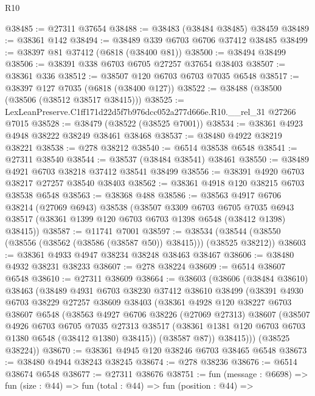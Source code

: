 \begin{lexlean}{R10}
\begin{coremodule}
@38485 := @27311 @37654
@38488 := @38483 (@38484 @38485) @38459
@38489 := @38361 @142
@38494 := @38489 @339 @6703 @6706 @37412 @38485
@38499 := @38397 @81 @37412 (@6818 (@38400 @81))
@38500 := @38494 @38499
@38506 := @38391 @338 @6703 @6705 @27257 @37654 @38403
@38507 := @38361 @336
@38512 := @38507 @120 @6703 @6703 @7035 @6548
@38517 := @38397 @127 @7035 (@6818 (@38400 @127))
@38522 := @38488 (@38500 (@38506 (@38512 @38517 @38415)))
@38525 := LexLeanPreserve.C1ff171d22d5f7b976dcc052a277d666e.R10.__rel_31 @27266 @7015
@38528 := @38479 (@38522 (@38525 @7001))
@38534 := @38361 @4923 @4948 @38222 @38249 @38461 @38468
@38537 := @38480 @4922 @38219 @38221
@38538 := @278 @38212
@38540 := @6514 @38538 @6548
@38541 := @27311 @38540
@38544 := @38537 (@38484 @38541) @38461
@38550 := @38489 @4921 @6703 @38218 @37412 @38541 @38499
@38556 := @38391 @4920 @6703 @38217 @27257 @38540 @38403
@38562 := @38361 @4918 @120 @38215 @6703 @38538 @6548
@38563 := @38368 @488
@38586 := @38563
    @4917
    @6706
    @38214
    (@27069 @6943)
    @38538
    (@38507
      @3309
      @6703
      @6705
      @7035
      @6943
      @38517
      (@38361 @1399 @120 @6703 @6703 @1398 @6548 (@38412 @1398) @38415))
@38587 := @11741 @7001
@38597 := @38534 (@38544 (@38550 (@38556 (@38562 (@38586 (@38587 @50)) @38415))) (@38525 @38212))
@38603 := @38361 @4933 @4947 @38234 @38248 @38463 @38467
@38606 := @38480 @4932 @38231 @38233
@38607 := @278 @38224
@38609 := @6514 @38607 @6548
@38610 := @27311 @38609
@38664 := @38603
    (@38606
      (@38484 @38610)
      @38463
      (@38489
        @4931
        @6703
        @38230
        @37412
        @38610
        @38499
        (@38391
          @4930
          @6703
          @38229
          @27257
          @38609
          @38403
          (@38361
            @4928
            @120
            @38227
            @6703
            @38607
            @6548
            (@38563
              @4927
              @6706
              @38226
              (@27069 @27313)
              @38607
              (@38507
                @4926
                @6703
                @6705
                @7035
                @27313
                @38517
                (@38361 @1381 @120 @6703 @6703 @1380 @6548 (@38412 @1380) @38415))
              (@38587 @87))
            @38415)))
      (@38525 @38224))
@38670 := @38361 @4945 @120 @38246 @6703 @38465 @6548
@38673 := @38480 @4944 @38243 @38245
@38674 := @278 @38236
@38676 := @6514 @38674 @6548
@38677 := @27311 @38676
@38751 := fun (message : @6698) =>
  fun (size : @44) =>
  fun (total : @44) =>
  fun (position : @44) =>

\end{coremodule}
\end{lexlean}
